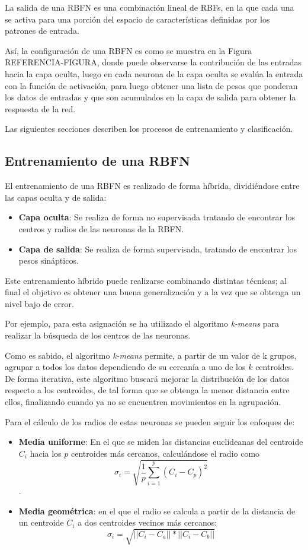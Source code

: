 \documentclass[journal]{IEEEtran}
\begin{document}
La salida de una RBFN es una combinación lineal de RBFs, en la que cada una se activa para una porción del espacio de características definidas por los patrones de entrada.

Así, la configuración de una RBFN es como se muestra en la Figura REFERENCIA-FIGURA, donde puede observarse la contribución de las entradas hacia la capa oculta, luego en cada neurona de la capa oculta se evalúa la entrada con la función de activación, para luego obtener una lista de pesos que ponderan los datos de entradas y que son acumulados en la capa de salida para obtener la respuesta de la red.

Las siguientes secciones describen los procesos de entrenamiento y clasificación.
\subsection{Entrenamiento de una RBFN} %
\label{sub:entrenamiento_de_una_RNA}
El entrenamiento de una RBFN es realizado de forma híbrida, dividiéndose entre las capas oculta y de salida:
\begin{itemize}
	\item \textbf{Capa oculta}: Se realiza de forma no supervisada tratando de encontrar los centros y radios de las neuronas de la RBFN.
	\item \textbf{Capa de salida}: Se realiza de forma supervisada, tratando de encontrar los pesos sinápticos.
\end{itemize}

Este entrenamiento híbrido puede realizarse combinando distintas técnicas; al final el objetivo es obtener una buena generalización y a la vez que se obtenga un nivel bajo de error.

Por ejemplo, para esta asignación se ha utilizado el algoritmo \emph{k-means} para realizar la búsqueda de los centros de las neuronas.

Como es sabido, el algoritmo \emph{k-means} permite, a partir de un valor de k grupos, agrupar a todos los datos dependiendo de su cercanía a uno de los $k$ centroides.
De forma iterativa, este algoritmo buscará mejorar la distribución de los datos respecto a los centroides, de tal forma que se obtenga la menor distancia entre ellos, finalizando cuando ya no se encuentren movimientos en la agrupación.

Para el cálculo de los radios de estas neuronas se pueden seguir los enfoques de:
\begin{itemize}
	\item \textbf{Media uniforme}: En el que se miden las distancias euclideanas del centroide $C_i$ hacia los $p$ centroides más cercanos, calculándose el radio como $$\sigma _i = \sqrt{\frac{1}{p}\sum_{i=1}^p (C_i - C_p)^2}$$.
	\item \textbf{Media geométrica}: en el que el radio se calcula a partir de la distancia de un centroide $C_i$ a dos centroides vecinos más cercanos: $$\sigma _i = \sqrt{||C_i - C_a||*||C_i - C_b||}$$
\end{itemize}
\end{document}
